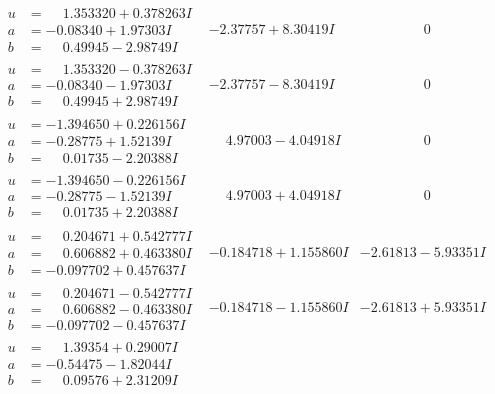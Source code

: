 \documentclass[1p]{elsarticle_modified}
\theoremstyle{definition}
\begin{document}
$$\begin{array}{c|c|c}
\begin{aligned}
u &= \phantom{-}1.353320 + 0.378263 I \\
a &= -0.08340 + 1.97303 I \\
b &= \phantom{-}0.49945 - 2.98749 I\end{aligned}
 & -2.37757 + 8.30419 I & \phantom{-0.000000 } 0 \\ \hline\begin{aligned}
u &= \phantom{-}1.353320 - 0.378263 I \\
a &= -0.08340 - 1.97303 I \\
b &= \phantom{-}0.49945 + 2.98749 I\end{aligned}
 & -2.37757 - 8.30419 I & \phantom{-0.000000 } 0 \\ \hline\begin{aligned}
u &= -1.394650 + 0.226156 I \\
a &= -0.28775 + 1.52139 I \\
b &= \phantom{-}0.01735 - 2.20388 I\end{aligned}
 & \phantom{-}4.97003 - 4.04918 I & \phantom{-0.000000 } 0 \\ \hline\begin{aligned}
u &= -1.394650 - 0.226156 I \\
a &= -0.28775 - 1.52139 I \\
b &= \phantom{-}0.01735 + 2.20388 I\end{aligned}
 & \phantom{-}4.97003 + 4.04918 I & \phantom{-0.000000 } 0 \\ \hline\begin{aligned}
u &= \phantom{-}0.204671 + 0.542777 I \\
a &= \phantom{-}0.606882 + 0.463380 I \\
b &= -0.097702 + 0.457637 I\end{aligned}
 & -0.184718 + 1.155860 I & -2.61813 - 5.93351 I \\ \hline\begin{aligned}
u &= \phantom{-}0.204671 - 0.542777 I \\
a &= \phantom{-}0.606882 - 0.463380 I \\
b &= -0.097702 - 0.457637 I\end{aligned}
 & -0.184718 - 1.155860 I & -2.61813 + 5.93351 I \\ \hline\begin{aligned}
u &= \phantom{-}1.39354 + 0.29007 I \\
a &= -0.54475 - 1.82044 I \\
b &= \phantom{-}0.09576 + 2.31209 I\end{aligned}

\end{array}$$
\end{document}
